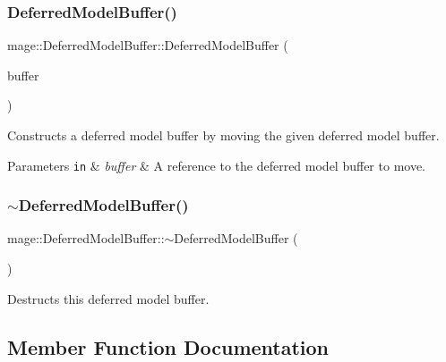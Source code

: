 \subsubsection{\texorpdfstring{Deferred\+Model\+Buffer()}{DeferredModelBuffer()}\hspace{0.1cm}{\footnotesize\ttfamily [3/3]}}
{\footnotesize\ttfamily mage\+::\+Deferred\+Model\+Buffer\+::\+Deferred\+Model\+Buffer (\begin{DoxyParamCaption}\item[{\hyperlink{structmage_1_1_deferred_model_buffer}{Deferred\+Model\+Buffer} \&\&}]{buffer }\end{DoxyParamCaption})\hspace{0.3cm}{\ttfamily [default]}}

Constructs a deferred model buffer by moving the given deferred model buffer.


\begin{DoxyParams}[1]{Parameters}
\mbox{\tt in}  & {\em buffer} & A reference to the deferred model buffer to move. \\
\hline
\end{DoxyParams}
\hypertarget{structmage_1_1_deferred_model_buffer_a94a9fe29f0abeaa0583b98de71902897}{}\label{structmage_1_1_deferred_model_buffer_a94a9fe29f0abeaa0583b98de71902897} 
\subsubsection{\texorpdfstring{$\sim$\+Deferred\+Model\+Buffer()}{~DeferredModelBuffer()}}
{\footnotesize\ttfamily mage\+::\+Deferred\+Model\+Buffer\+::$\sim$\+Deferred\+Model\+Buffer (\begin{DoxyParamCaption}{ }\end{DoxyParamCaption})\hspace{0.3cm}{\ttfamily [default]}}

Destructs this deferred model buffer. 

\subsection{Member Function Documentation}
\hypertarget{structmage_1_1_deferred_model_buffer_aaaa9056b22ab42b65273406c6b85e0a2}{}\label{structmage_1_1_deferred_model_buffer_aaaa9056b22ab42b65273406c6b85e0a2} 
